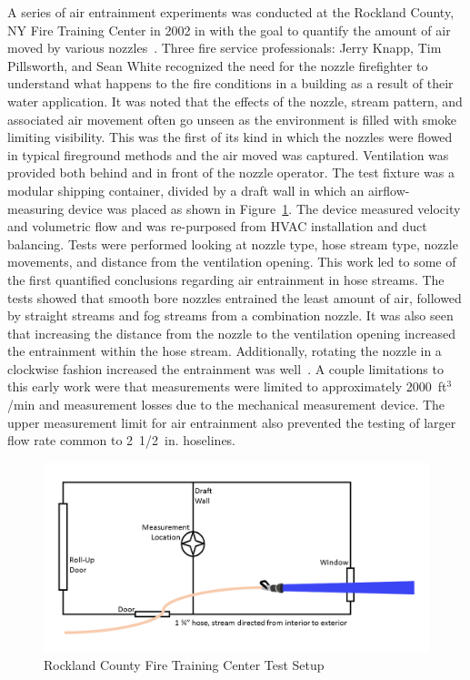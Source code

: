 \documentclass[12pt,oneside]{book}
\begin{document}
A series of air entrainment experiments was conducted at the Rockland County, NY Fire Training Center in 2002 in with the goal to quantify the amount of air moved by various nozzles~\cite{KnappNozzles1}. Three fire service professionals: Jerry Knapp, Tim Pillsworth, and Sean White recognized the need for the nozzle firefighter to understand what happens to the fire conditions in a building as a result of their water application. It was noted that the effects of the nozzle, stream pattern, and associated air movement often go unseen as the environment is filled with smoke limiting visibility. This was the first of its kind in which the nozzles were flowed in typical fireground methods and the air moved was captured. Ventilation was provided both behind and in front of the nozzle operator. The test fixture was a modular shipping container, divided by a draft wall in which an airflow-measuring device was placed as shown in Figure~\ref{fig:Rockland_County_Test_Setup}. The device measured velocity and volumetric flow and was re-purposed from HVAC installation and duct balancing. Tests were performed looking at nozzle type, hose stream type, nozzle movements, and distance from the ventilation opening. This work led to some of the first quantified conclusions regarding air entrainment in hose streams. The tests showed that smooth bore nozzles entrained the least amount of air, followed by straight streams and fog streams from a combination nozzle. It was also seen that increasing the distance from the nozzle to the ventilation opening increased the entrainment within the hose stream. Additionally, rotating the nozzle in a clockwise fashion increased the entrainment was well~\cite{KnappNozzles1,KnappNozzles2,KnappNozzles3}. A couple limitations to this early work were that measurements were limited to approximately 2000~ft$^3$/min and measurement losses due to the mechanical measurement device. The upper measurement limit for air entrainment also prevented the testing of larger flow rate common to 2~1/2~in. hoselines.

\begin{figure}[!ht]
	\centering
	\includegraphics[width=\columnwidth]{Figures/Air_Entrainment/Knapp_Layout.png}
	\caption{Rockland County Fire Training Center Test Setup}
	\label{fig:Rockland_County_Test_Setup}
\end{figure}
\end{document}
